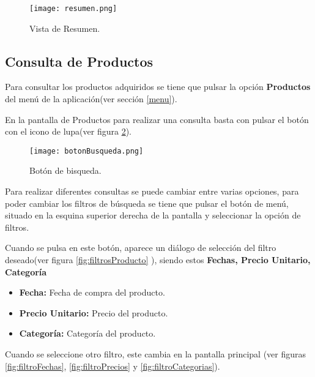 \begin{figure}[ht]
\begin{center}
  \texttt{[image: resumen.png]}
  \caption{Vista de Resumen.}\label{fig:resumen}
\endminipage 
\end{center}
\end{figure} 

\cleardoublepage
\subsection{Consulta de Productos \label{consultaProdutos}}

Para consultar los productos adquiridos se tiene que pulsar la opción \textbf{Productos} del menú de la aplicación(ver sección \ref{menu}).

En la pantalla de Productos para realizar una consulta basta con pulsar el botón con el icono de lupa(ver figura \ref{fig:botonBusqueda}). 

\begin{figure}[ht]
\begin{center}
  \texttt{[image: botonBusqueda.png]}
  \caption{Botón  de bisqueda.}\label{fig:botonBusqueda}
\endminipage
\end{center}
\end{figure}

Para realizar diferentes consultas se puede cambiar entre varias opciones, para poder cambiar los filtros de búsqueda se tiene que pulsar el botón de menú, situado en la esquina superior derecha de la pantalla y seleccionar la opción de filtros.


Cuando se pulsa en este botón, aparece un diálogo de selección del filtro deseado(ver figura \ref{fig:filtrosProducto} ), siendo estos \textbf{Fechas, Precio Unitario, Categoría}
\begin{itemize}
	\item \textbf{Fecha: }Fecha de compra del producto.
	\item\textbf{Precio Unitario: }Precio del producto.
	\item \textbf{Categoría: } Categoría del producto.
\end{itemize} Cuando se seleccione otro filtro, este cambia en la pantalla principal (ver figuras \ref{fig:filtroFechas}, \ref{fig:filtroPrecios} y \ref{fig:filtroCategorias}).



